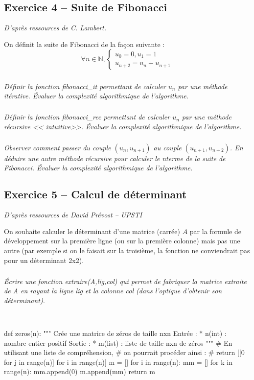 \documentclass[10pt,fleqn]{article} %
\begin{document}
\begin{multicols}{2}
\subsection*{Exercice 4 -- Suite de Fibonacci}
\textit{D'après ressources de C. Lambert.}

\setcounter{exo}{0}
On définit la suite de Fibonacci de la façon suivante : 
$$
\forall n\in \mathbb{N}, \left\{ \begin{array}{l}
u_0 = 0, u_1 = 1 \\
u_{n+2} = u_{n} + u_{n+1}
\end{array}\right.
$$

\subparagraph{}
\textit{Définir la fonction \textsl{fibonacci\_it} permettant de calculer $u_n$ par une méthode itérative. Évaluer la complexité algorithmique de l'algorithme.}

\subparagraph{}
\textit{Définir la fonction \textsl{fibonacci\_rec} permettant de calculer $u_n$ par une méthode récursive << intuitive>>. Évaluer la complexité algorithmique de l'algorithme.}


\subparagraph{}
\textit{Observer comment passer du couple $(u_n,u_{n+1})$ au couple $(u_{n+1},u_{n+2})$. En déduire une autre méthode récursive pour calculer le n\ieme terme de la suite de Fibonacci. Évaluer la complexité algorithmique de l'algorithme.}

\subsection*{Exercice 5 -- Calcul de déterminant}
\setcounter{exo}{0}

\textit{D'après ressources de David Prévost -- UPSTI}

On souhaite calculer le déterminant d’une matrice (carrée) $A$ par la formule de développement
sur la première ligne (ou sur la première colonne) mais pas une autre (par exemple si on le
faisait sur la troisième, la fonction ne conviendrait pas pour un déterminant 2x2).
\subparagraph{}
\textit{Écrire une fonction \textsl{extraire(A,lig,col)} qui permet de fabriquer la matrice
extraite de \textsl{A} en rayant la ligne \textsl{lig} et la colonne \textsl{col} (dans l’optique d’obtenir son déterminant).}
\ifprof
\begin{corrige}
~\\
\begin{python}
def zeros(n):
    """
    Crée une matrice de zéros de taille nxn
    Entrée : 
     * n(int) : nombre entier positif
    Sortie :
     * m(list) : liste de taille nxn de zéros
    """
    # En utilisant une liste de compréhension, 
    # on pourrait procéder ainsi :
    # return [[0 for j in range(n)] for i in range(n)]
    m = []
    for i in range(n):
        mm = []
        for k in range(n):
            mm.append(0)
        m.append(mm)
    return m
\end{python}
\end{corrige}


\end{multicols}
\end{document}

